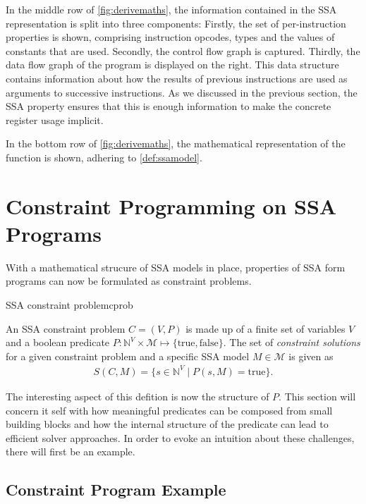     In the middle row of \autoref{fig:derivemaths}, the information contained in
    the SSA representation is split into three components:
    Firstly, the set of per-instruction properties is shown, comprising
    instruction opcodes, types and the values of constants that are used.
    Secondly, the control flow graph is captured.
    Thirdly, the data flow graph of the program is displayed on the right.
    This data structure contains information about how the results of previous
    instructions are used as arguments to successive instructions.
    As we discussed in the previous section, the SSA property ensures that this
    is enough information to make the concrete register usage implicit.

    In the bottom row of \autoref{fig:derivemaths}, the mathematical
    representation of the function is shown, adhering to \autoref{def:ssamodel}.


\section{Constraint Programming on SSA Programs}

    With a mathematical strucure of SSA models in place, properties of SSA form
    programs can now be formulated as constraint problems.

\begin{definition}{SSA constraint problem}{cprob}

    An SSA constraint problem $C=(V,P)$ is made up of a finite set of variables
    $V$ and a boolean predicate
    $P\colon\mathbb N^V\times\mathcal M\mapsto\{\text{true}, \text{false}\}$.
    The set of {\em constraint solutions} for a given constraint problem and a
    specific SSA model $M\in\mathcal M$ is given as
    \begin{align*}
        S(C,M) = \{s\in\mathbb N^V\mid P(s,M)=\text{true}\}.
    \end{align*}
\end{definition}

    The interesting aspect of this defition is now the structure of $P$.
    This section will concern it self with how meaningful predicates can be
    composed from small building blocks and how the internal structure of the
    predicate can lead to efficient solver approaches.
    In order to evoke an intuition about these challenges, there will first be
    an example.

\subsection{Constraint Program Example}

